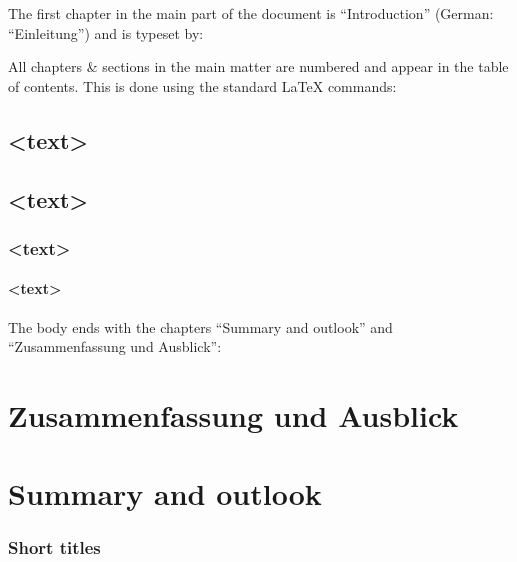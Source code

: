 \documentclass[
  paper = 17x24, %
  language = english, %
  acronym = true, %
  bibliography = true, %
  acronymline = onlyhorizontal, %
]{faupress}
\begin{document}
The first chapter in the main part of the document is \enquote{Introduction}
(German: \enquote{Einleitung}) and is typeset by:
\begin{codebox}[custom]
  \begin{introduction}    
  \end{introduction}
\end{codebox}
All chapters \& sections in the main matter are numbered and appear in the table of
contents. This is done using the standard \LaTeX{} commands:
\begin{codebox}
  \chapter{<text>}
  \section{<text>}
  \subsection{<text>}
  \subsubsection{<text>}
\end{codebox}
The body ends with the chapters \enquote{Summary and outlook} and \enquote{Zusammenfassung
  und Ausblick}:
\begin{codebox}
  \chapter{Zusammenfassung und Ausblick}
  \chapter{Summary and outlook}
\end{codebox}

\newpage
\subsection{Short titles}
\end{document}
